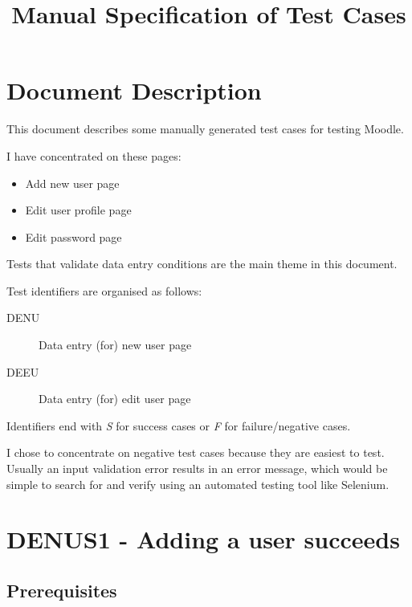 \documentclass{article}
\title{Manual Specification of Test Cases}
\begin{document}
\maketitle


\tableofcontents

\section{Document Description}

This document describes some manually generated test cases for testing
Moodle.

I have concentrated on these pages:

\begin{itemize}
  \item Add new user page
  \item Edit user profile page
  \item Edit password page
\end{itemize}

Tests that validate data entry conditions are the main theme in this document.

Test identifiers are organised as follows:

\begin{description}
  \item[DENU] Data entry (for) new user page
  \item[DEEU] Data entry (for) edit user page
\end{description}

Identifiers end with \emph{S} for success cases or \emph{F} for
failure/negative cases.

I chose to concentrate on negative test cases because they are easiest
to test. Usually an input validation error results in an error message,
which would be simple to search for and verify using an automated
testing tool like Selenium.


\section*{DENUS1 - Adding a user succeeds}

\subsection*{Prerequisites}
\end{document}
